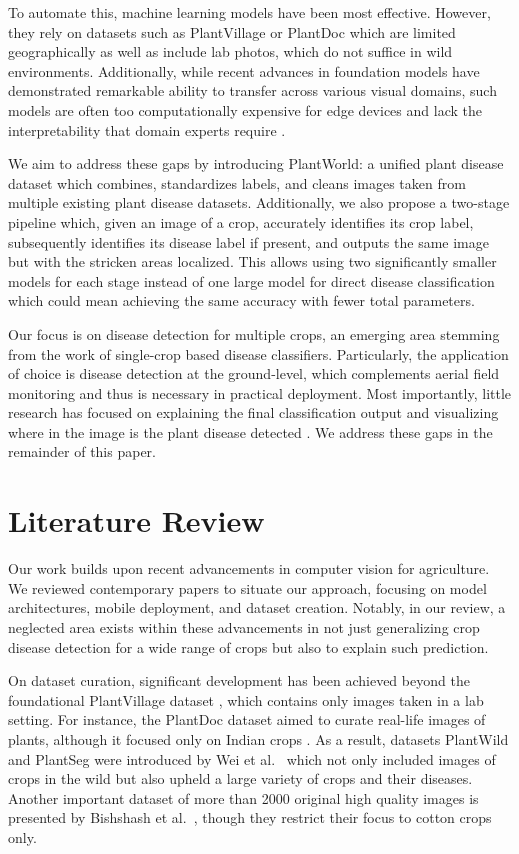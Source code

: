 \documentclass[runningheads]{llncs}
\begin{document}
To automate this, machine learning models have been most effective. However, they rely on datasets such as PlantVillage or PlantDoc which are limited geographically as well as include lab photos, which do not suffice in wild environments. Additionally, while recent advances in foundation models have demonstrated remarkable ability to transfer across various visual domains, such models are often too computationally expensive for edge devices and lack the interpretability that domain experts require \cite{pal2025lightweight}.

We aim to address these gaps by introducing PlantWorld: a unified plant disease dataset which combines, standardizes labels, and cleans images taken from multiple existing plant disease datasets. Additionally, we also propose a two-stage pipeline which, given an image of a crop, accurately identifies its crop label, subsequently identifies its disease label if present, and outputs the same image but with the stricken areas localized. This allows using two significantly smaller models for each stage instead of one large model for direct disease classification which could mean achieving the same accuracy with fewer total parameters.

Our focus is on disease detection for multiple crops, an emerging area stemming from the work of single-crop based disease classifiers. Particularly, the application of choice is disease detection at the ground-level, which complements aerial field monitoring and thus is necessary in practical deployment. Most importantly, little research has focused on explaining the final classification output and visualizing where in the image is the plant disease detected \cite{kaler2025}. We address these gaps in the remainder of this paper.

\section{Literature Review}
\label{sec:lit}

Our work builds upon recent advancements in computer vision for agriculture. We reviewed contemporary papers to situate our approach, focusing on model architectures, mobile deployment, and dataset creation. Notably, in our review, a neglected area exists within these advancements in not just generalizing crop disease detection for a wide range of crops but also to explain such prediction.

On dataset curation, significant development has been achieved beyond the foundational PlantVillage dataset \cite{mohanty2016}, which contains only images taken in a lab setting. For instance, the PlantDoc dataset aimed to curate real-life images of plants, although it focused only on Indian crops \cite{singh2020}. As a result, datasets PlantWild and PlantSeg were introduced by Wei et al.~\cite{wei2024a, wei2024b} which not only included images of crops in the wild but also upheld a large variety of crops and their diseases. Another important dataset of more than 2000 original high quality images is presented by Bishshash et al.~\cite{bishshash2024}, though they restrict their focus to cotton crops only.
\end{document}
